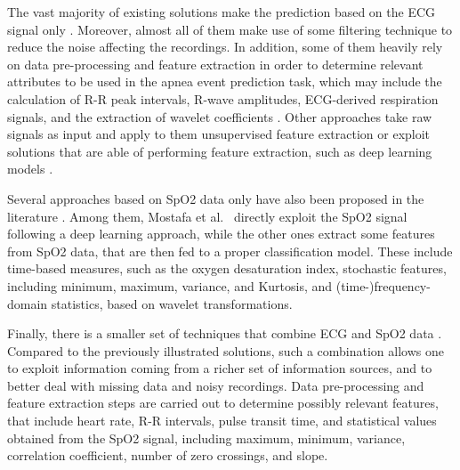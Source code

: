 \documentclass[5p,twocolumn,lefttitle]{elsarticle}
\begin{document}
The vast majority of existing solutions make the prediction based on the ECG signal only  \cite{DBLP:journals/titb/KhandokerGP09,DBLP:journals/jms/UrtnasanPJL18,DBLP:journals/cmpb/UrtnasanKPJL19,nasifoglu2021obstructive,bozkurt2020detection,DBLP:conf/cse/ChengSJKL17,dey2018obstructive,li2018method,DBLP:journals/sensors/ChangYLL20,almutairi2020detection,sharma2020sleep,zarei2020performance,feng2020sleep,shen2021multiscale,10.1371/journal.pone.0250618,FAAL2021102685,DBLP:journals/titb/KhandokerPK09,fatimah2020detection}. Moreover, almost all of them make use of some filtering technique to reduce the noise affecting the recordings. In addition, some of them heavily rely on data pre-processing and feature extraction in order to determine relevant attributes to be used in the apnea event prediction task, which may include the calculation of R-R peak intervals, R-wave amplitudes, ECG-derived respiration signals, and the extraction of wavelet coefficients \cite{DBLP:journals/titb/KhandokerGP09,nasifoglu2021obstructive,bozkurt2020detection,DBLP:conf/cse/ChengSJKL17,sharma2020sleep,shen2021multiscale,10.1371/journal.pone.0250618,DBLP:journals/titb/KhandokerPK09,fatimah2020detection}. Other approaches take raw signals as input and apply to them unsupervised feature extraction or exploit solutions that are able of performing feature extraction, such as deep learning models \cite{DBLP:journals/jms/UrtnasanPJL18,DBLP:journals/cmpb/UrtnasanKPJL19,dey2018obstructive,li2018method,DBLP:journals/sensors/ChangYLL20,almutairi2020detection,zarei2020performance,feng2020sleep,FAAL2021102685}.

Several approaches based on SpO2 data only have also been proposed in the literature \cite{alvarez2012feature,morillo2013probabilistic,DBLP:journals/nca/UcarBBP17,morales2017sleep,hwang2017real,almazaydeh2012neural,mostafa2017optimization,mostafa2017spo2}. 
Among them, Mostafa et al.\ \cite{mostafa2017spo2} directly exploit the SpO2 signal following a deep learning approach, while the other ones extract some features from SpO2 data, that are then fed to a proper classification model. These include time-based measures, such as the oxygen desaturation index, stochastic features, including minimum, maximum, variance, and Kurtosis, and \mbox{(time-)frequency-domain} statistics, based on wavelet transformations. 

Finally, there is a smaller set of techniques that combine ECG and SpO2 data \cite{ravelo2015oxygen,tuncer2019deep,pathinarupothi2017single,xie2012real}. Compared to the previously illustrated solutions, such a combination allows one to exploit information coming from a richer set of information sources, and to better deal with missing data and noisy recordings. Data pre-processing and feature extraction steps are carried out to determine possibly relevant features, that include heart rate, R-R intervals, pulse transit time, and statistical values obtained from the SpO2 signal, including maximum, minimum, variance, correlation coefficient, number of zero crossings, and slope.
\end{document}
